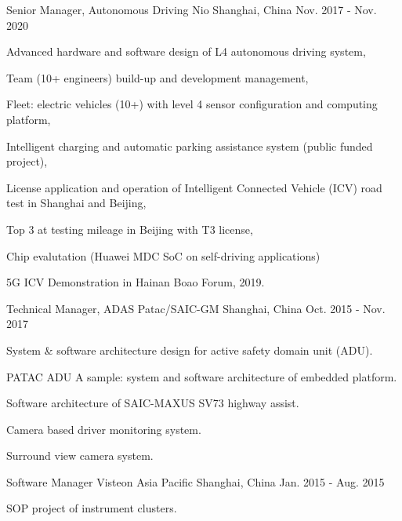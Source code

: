 \documentclass[../resume.tex]{subfiles}
\begin{document}
\begin{cventries}
  \cventry
    {Senior Manager, Autonomous Driving} %
    {Nio} %
    {Shanghai, China} %
    {Nov. 2017 - Nov. 2020} %
    {
      \begin{cvitems}
        \item Advanced hardware and software design of L4 autonomous driving system,
        \item Team (10+ engineers) build-up and development management,
        \item Fleet: electric vehicles (10+) with level 4 sensor configuration and computing platform,
        \item Intelligent charging and automatic parking assistance system (public funded project),
        \item License application and operation of Intelligent Connected Vehicle (ICV) road test in Shanghai and Beijing,
        \item Top 3 at testing mileage in Beijing with T3 license,
        \item Chip evalutation (Huawei MDC SoC on self-driving applications)
        \item 5G ICV Demonstration in Hainan Boao Forum, 2019.
      \end{cvitems}
    }

  \cventry
    {Technical Manager, ADAS} %
    {Patac/SAIC-GM} %
    {Shanghai, China} %
    {Oct. 2015 - Nov. 2017} %
    {
      \begin{cvitems}
        \item System \& software architecture design for active safety domain unit (ADU).
        \item PATAC ADU A sample: system and software architecture of embedded platform.
        \item Software architecture of SAIC-MAXUS SV73 highway assist.
        \item Camera based driver monitoring system.
        \item Surround view camera system.
      \end{cvitems}
    }


  \cventry
    {Software Manager} %
    {Visteon Asia Pacific} %
    {Shanghai, China} %
    {Jan. 2015 - Aug. 2015} %
    {
      \begin{cvitems}
        \item SOP project of instrument clusters.
      \end{cvitems}
    }


\end{cventries}
\end{document}
